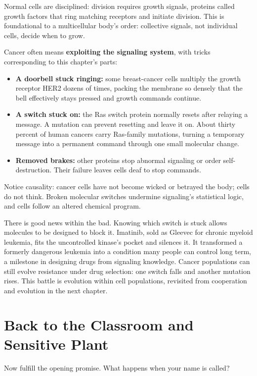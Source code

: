Normal cells are disciplined: division requires growth signals, proteins called growth factors that ring matching receptors and initiate division. This is foundational to a multicellular body's order: collective signals, not individual cells, decide when to grow.

Cancer often means \textbf{exploiting the signaling system}, with tricks corresponding to this chapter's parts:

\begin{itemize}[itemsep=2pt]
\item \textbf{A doorbell stuck ringing:} some breast-cancer cells multiply the growth receptor HER2 dozens of times, packing the membrane so densely that the bell effectively stays pressed and growth commands continue.
\item \textbf{A switch stuck on:} the Ras switch protein normally resets after relaying a message. A mutation can prevent resetting and leave it on. About thirty percent of human cancers carry Ras-family mutations, turning a temporary message into a permanent command through one small molecular change.
\item \textbf{Removed brakes:} other proteins stop abnormal signaling or order self-destruction. Their failure leaves cells deaf to stop commands.
\end{itemize}

Notice causality: cancer cells have not become wicked or betrayed the body; cells do not think. Broken molecular switches undermine signaling's statistical logic, and cells follow an altered chemical program.

There is good news within the bad. Knowing which switch is stuck allows molecules to be designed to block it. Imatinib, sold as Gleevec for chronic myeloid leukemia, fits the uncontrolled kinase's pocket and silences it. It transformed a formerly dangerous leukemia into a condition many people can control long term, a milestone in designing drugs from signaling knowledge. Cancer populations can still evolve resistance under drug selection: one switch falls and another mutation rises. This battle is evolution within cell populations, revisited from cooperation and evolution in the next chapter.

\section{Back to the Classroom and Sensitive Plant}

Now fulfill the opening promise. What happens when your name is called?

